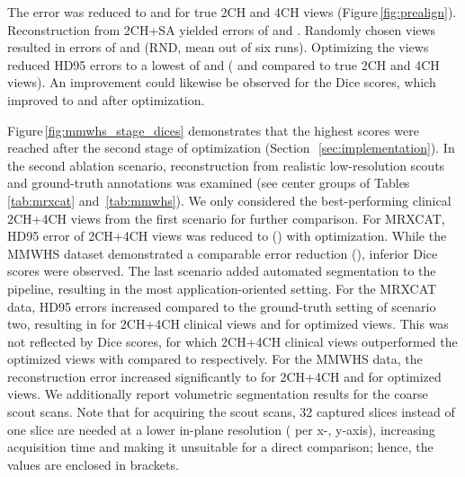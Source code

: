     The error was reduced to  and  for true 2CH and 4CH views (Figure\,\ref{fig:prealign}).
    Reconstruction from 2CH+SA yielded errors of  and . Randomly chosen views resulted in errors of  and  (RND, mean out of six runs).
    Optimizing the views reduced HD95 errors to a lowest of  and  ( and  compared to true 2CH and 4CH views).
    An improvement could likewise be observed for the Dice scores, which improved to  and  after optimization.

    Figure\,\ref{fig:mmwhs_stage_dices} demonstrates that the highest scores were reached after the second stage of optimization (Section~\,\ref{sec:implementation}).
    In the second ablation scenario, reconstruction from realistic low-resolution scouts and ground-truth annotations was examined (see center groups of Tables\,\ref{tab:mrxcat} and \,\ref{tab:mmwhs}). We only considered the best-performing clinical 2CH+4CH views from the first scenario for further comparison.
    For MRXCAT,  HD95 error of 2CH+4CH views was reduced to  () with optimization.
    While the MMWHS dataset demonstrated a comparable error reduction (), inferior Dice scores were observed.
    The last scenario added automated segmentation to the pipeline, resulting in the most application-oriented setting.
    For the MRXCAT data, HD95 errors increased compared to the ground-truth setting of scenario two, resulting in  for 2CH+4CH clinical views and  for optimized views. This was not reflected by Dice scores, for which 2CH+4CH clinical views outperformed the optimized views with  compared to  respectively.
    For the MMWHS data, the reconstruction error increased significantly to  for 2CH+4CH and  for optimized views.
    We additionally report volumetric segmentation results for the coarse scout scans. Note that for acquiring the scout scans, 32 captured slices instead of one slice are needed at a lower in-plane resolution ( per x-, y-axis), increasing acquisition time and making it unsuitable for a direct comparison; hence, the values are enclosed in brackets.


